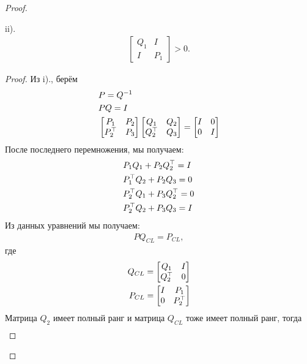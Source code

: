 \begin{proof}
\begin{lemma}
		ii). \begin{align*}
			\begin{bmatrix} 
				{Q}_{1} & I \\ 
				I & {P}_{1}
			\end{bmatrix} > 0.
		\end{align*}
	\end{lemma}
	\begin{proof}
		Из i)., берём 
		\begin{align}
			&{P} = {Q}^{-1}\\
			&{P}{Q}={I}\\
			&\begin{bmatrix} 
				{P}_{1} & {P}_{2}\\ 
				{P}_{2}^\top & {P}_{3} 
			\end{bmatrix}
			\begin{bmatrix} 
				{Q}_{1} & {Q}_{2} \\ 
				{Q}_{2}^\top & {Q}_{3}
			\end{bmatrix} = 
			\begin{bmatrix}
				{I} & 0 \\
				0 & {I}
			\end{bmatrix}
		\end{align}
		После последнего перемножения, мы получаем:
		\begin{align}
			&{P}_{1}{Q}_{1}+{P}_{2}{Q}_{2}^\top ={I}\\
			&{P}_{1}^\top{Q}_{2}+{P}_{2}{Q}_{3} =0\label{eq: lemma mult1}\\
			&{P}_{2}^\top{Q}_{1}+{P}_{3}{Q}_{2}^\top=0\\
			&{P}_{2}^\top{Q}_{2}+{P}_{3}{Q}_{3}= {I} \label{eq: lemma mult2}
		\end{align}
		Из данных уравнений мы получаем:
		\begin{align}
			{P}{Q}_{CL}={P}_{CL},
		\end{align}
		где
		\begin{align}
			{Q}_{CL}=
			\begin{bmatrix}
				{Q}_{1} & {I}\\
				{Q}_{2}^\top & 0
			\end{bmatrix}\\
			{P}_{CL}=
			\begin{bmatrix}
				{I} & {P}_{1} \\
				0 & {P}_{2}^\top
			\end{bmatrix}
		\end{align}
		Матрица ${Q}_{2}$ имеет полный ранг и матрица ${Q}_{CL}$ тоже имеет полный ранг, тогда
		\begin{align}

\end{align}
\end{proof}
\end{proof}
